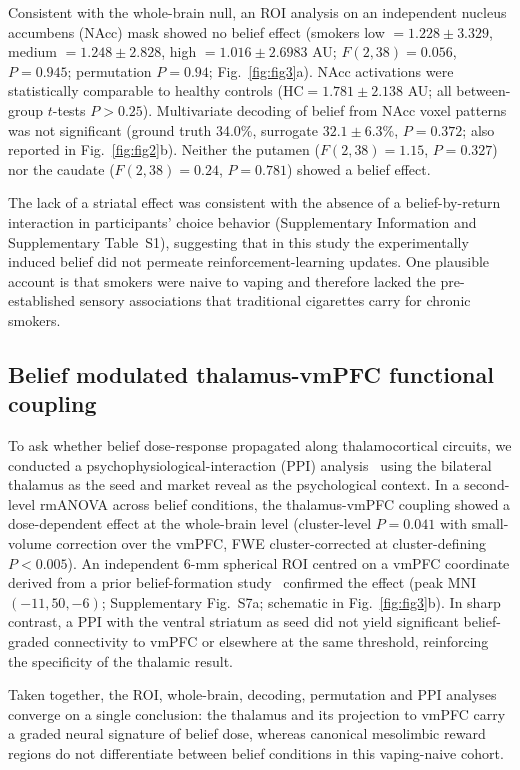 \documentclass[11pt]{article}
\begin{document}
Consistent with the whole-brain null, an ROI analysis on an independent nucleus accumbens (NAcc) mask showed no belief effect (smokers low $=1.228 \pm 3.329$, medium $=1.248 \pm 2.828$, high $=1.016 \pm 2.6983$ AU; $F(2,38)=0.056$, $P=0.945$; permutation $P=0.94$; Fig.~\ref{fig:fig3}a). NAcc activations were statistically comparable to healthy controls ($\mathrm{HC}=1.781 \pm 2.138$ AU; all between-group $t$-tests $P>0.25$). Multivariate decoding of belief from NAcc voxel patterns was not significant (ground truth 34.0\%, surrogate $32.1 \pm 6.3$\%, $P=0.372$; also reported in Fig.~\ref{fig:fig2}b). Neither the putamen ($F(2,38)=1.15$, $P=0.327$) nor the caudate ($F(2,38)=0.24$, $P=0.781$) showed a belief effect.

The lack of a striatal effect was consistent with the absence of a belief-by-return interaction in participants' choice behavior (Supplementary Information and Supplementary Table~S1), suggesting that in this study the experimentally induced belief did not permeate reinforcement-learning updates. One plausible account is that smokers were naive to vaping and therefore lacked the pre-established sensory associations that traditional cigarettes carry for chronic smokers.

\subsection{Belief modulated thalamus-vmPFC functional coupling}

To ask whether belief dose-response propagated along thalamocortical circuits, we conducted a psychophysiological-interaction (PPI) analysis~\cite{friston1997psychophysiological} using the bilateral thalamus as the seed and market reveal as the psychological context. In a second-level rmANOVA across belief conditions, the thalamus-vmPFC coupling showed a dose-dependent effect at the whole-brain level (cluster-level $P=0.041$ with small-volume correction over the vmPFC, FWE cluster-corrected at cluster-defining $P<0.005$). An independent 6-mm spherical ROI centred on a vmPFC coordinate derived from a prior belief-formation study~\cite{rouault2018belief} confirmed the effect (peak MNI $(-11, 50, -6)$; Supplementary Fig.~S7a; schematic in Fig.~\ref{fig:fig3}b). In sharp contrast, a PPI with the ventral striatum as seed did not yield significant belief-graded connectivity to vmPFC or elsewhere at the same threshold, reinforcing the specificity of the thalamic result.

Taken together, the ROI, whole-brain, decoding, permutation and PPI analyses converge on a single conclusion: the thalamus and its projection to vmPFC carry a graded neural signature of belief dose, whereas canonical mesolimbic reward regions do not differentiate between belief conditions in this vaping-naive cohort.
\end{document}

